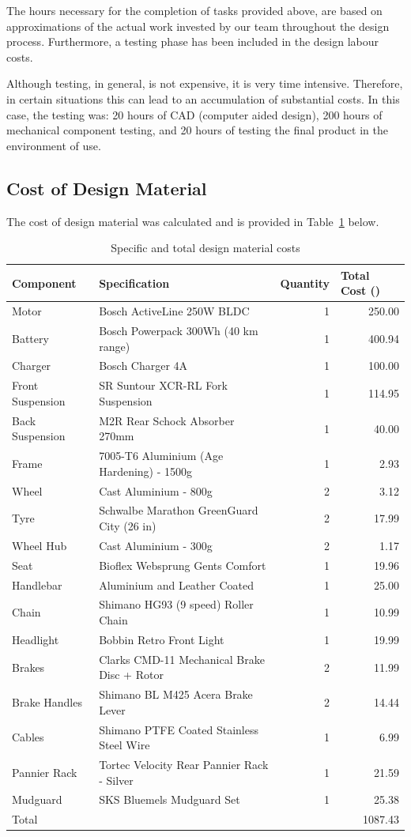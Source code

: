 \documentclass[a4paper,11pt]{article}
\begin{document}
The hours necessary for the completion of tasks provided above, are based on approximations of the actual work invested by our team throughout the design process. Furthermore, a testing phase has been included in the design labour costs. 

Although testing, in general, is not expensive, it is very time intensive. Therefore, in certain situations this can lead to an accumulation of substantial costs. In this case, the testing was: 20 hours of CAD (computer aided design), 200 hours of mechanical component testing, and 20 hours of testing the final product in the environment of use. 

\subsection{Cost of Design Material}

The cost of design material was calculated and is provided in Table~\ref{tab:desmat} below. 

\begin{table}[!ht]
	\centering
	\caption{Specific and total design material costs}
	\begin{tabular}{l l r r}
		\hline
		\multicolumn{1}{l}{Component}&\multicolumn{1}{l}{Specification}&\multicolumn{1}{l}{Quantity}&\multicolumn{1}{l}{Total Cost (\textsterling)}\\\hline
		Motor&Bosch ActiveLine 250W BLDC&1&250.00\\
		Battery&Bosch Powerpack 300Wh (40 km range)&1&400.94\\
		Charger&Bosch Charger 4A&1&100.00\\
		Front Suspension&SR Suntour XCR-RL Fork Suspension&1&114.95\\
		Back Suspension&M2R Rear Schock Absorber 270mm&1&40.00\\
		Frame&7005-T6 Aluminium (Age Hardening) - 1500g&1&2.93\\
		Wheel&Cast Aluminium - 800g&2&3.12\\
		Tyre&Schwalbe Marathon GreenGuard City (26 in)&2&17.99\\
		Wheel Hub&Cast Aluminium - 300g&2&1.17\\
		Seat&Bioflex Websprung Gents Comfort&1&19.96\\
		Handlebar&Aluminium and Leather Coated&1&25.00\\
		Chain&Shimano HG93 (9 speed) Roller Chain&1&10.99\\
		Headlight&Bobbin Retro Front Light&1&19.99\\
		Brakes&Clarks CMD-11 Mechanical Brake Disc + Rotor&2&11.99\\
		Brake Handles&Shimano BL M425 Acera Brake Lever&2&14.44\\
		Cables&Shimano PTFE Coated Stainless Steel Wire&1&6.99\\
		Pannier Rack&Tortec Velocity Rear Pannier Rack - Silver&1&21.59\\
		Mudguard&SKS Bluemels Mudguard Set&1&25.38\\\hline
		Total&&&1087.43\\\hline
	\end{tabular}
	\label{tab:desmat}
\end{table}
\end{document}
